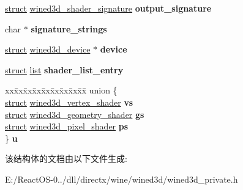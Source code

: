 \begin{DoxyCompactItemize}
\item 
\mbox{\label{structwined3d__shader_a3835fc37980740aebbf510b6b7931c11}} 
\hyperlink{interfacestruct}{struct} \hyperlink{structwined3d__shader__signature}{wined3d\+\_\+shader\+\_\+signature} {\bfseries output\+\_\+signature}
\item 
\mbox{\label{structwined3d__shader_af9128bfbeb072ddd333f9e60f2c55f76}} 
char $\ast$ {\bfseries signature\+\_\+strings}
\item 
\mbox{\label{structwined3d__shader_aeae7c7ee1c2409e49b3e431448f25882}} 
\hyperlink{interfacestruct}{struct} \hyperlink{structwined3d__device}{wined3d\+\_\+device} $\ast$ {\bfseries device}
\item 
\mbox{\label{structwined3d__shader_ab3f3e166adc71e3f3d9b95ea6ac18370}} 
\hyperlink{interfacestruct}{struct} \hyperlink{classlist}{list} {\bfseries shader\+\_\+list\+\_\+entry}
\item 
\mbox{\label{structwined3d__shader_a3e80ed85246d07f4e3e1d2ae5e2314bc}} 
\begin{tabbing}
xx\=xx\=xx\=xx\=xx\=xx\=xx\=xx\=xx\=\kill
union \{\\
\>\hyperlink{interfacestruct}{struct} \hyperlink{structwined3d__vertex__shader}{wined3d\_vertex\_shader} {\bfseries vs}\\
\>\hyperlink{interfacestruct}{struct} \hyperlink{structwined3d__geometry__shader}{wined3d\_geometry\_shader} {\bfseries gs}\\
\>\hyperlink{interfacestruct}{struct} \hyperlink{structwined3d__pixel__shader}{wined3d\_pixel\_shader} {\bfseries ps}\\
\} {\bfseries u}\\

\end{tabbing}\end{DoxyCompactItemize}


该结构体的文档由以下文件生成\+:\begin{DoxyCompactItemize}
\item 
E\+:/\+React\+O\+S-\/0../dll/directx/wine/wined3d/wined3d\+\_\+private.\+h\end{DoxyCompactItemize}
